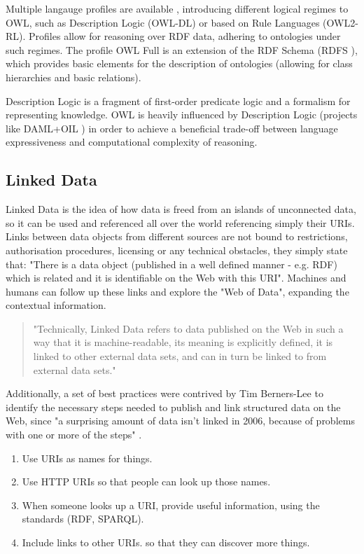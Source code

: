 \documentclass[a4paper,english,twoside,BCOR1.5cm,headsepline,DIV12,appendixprefix,final,12pt]{scrbook}
\begin{document}
Multiple langauge profiles are available \cite{OWLPROFILES}, introducing different logical regimes to OWL, such as Description Logic (OWL-DL) or based on Rule Languages (OWL2-RL). Profiles allow for reasoning over RDF data, adhering to ontologies under such regimes. The profile OWL Full is an extension of the RDF Schema (RDFS \cite{RDFS11}), which provides basic elements for the description of ontologies (allowing for class hierarchies and basic relations).

Description Logic is a fragment of first-order predicate logic \cite{Barwise1977} and a formalism for representing knowledge. OWL is heavily influenced by Description Logic (projects like DAML+OIL \cite{HPMW07}) in order to achieve a beneficial trade-off between language expressiveness and computational complexity of reasoning.


\subsection{Linked Data}
\label{sec:ld}
Linked Data is the idea of how data is freed from an islands of unconnected data, so it can be used and referenced all over the world referencing simply their URIs. Links between data objects from different sources are not bound to restrictions, authorisation procedures, licensing or any technical obstacles, they simply state that: "There is a data object (published in a well defined manner - e.g. RDF) which is related and it is identifiable on the Web with this URI". Machines and humans can follow up these links and explore the "Web of Data", expanding the contextual information.

\begin{quote}
"Technically, Linked Data refers to data published on the Web in such a way that it is
machine-readable, its meaning is explicitly defined, it is linked to other external data sets,
and can in turn be linked to from external data sets." \cite{bizer_linked_2009}
\end{quote}

Additionally, a set of best practices were contrived by Tim Berners-Lee to identify the necessary steps needed to publish and link structured data on the Web, since "a surprising amount of data isn't linked in 2006, because of problems with one or more of the steps" \cite{5starData}.

\begin{enumerate}
\item Use URIs as names for things.
\item Use HTTP URIs so that people can look up those names.
\item When someone looks up a URI, provide useful information, using the standards (RDF, SPARQL).
\item Include links to other URIs. so that they can discover more things.
\end{enumerate}
\end{document}

